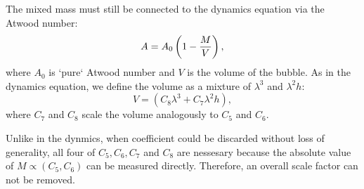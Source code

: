 The mixed mass must still be connected to the dynamics equation via the Atwood number:
\begin{equation} \elabel{effective-atwood}
A = A_0 \left( 1 - \frac{M}{V}\right),
\end{equation}
where $A_0$ is `pure` Atwood number and
$V$ is the volume of the bubble.
As in the dynamics equation, we define the volume as a mixture of $\lambda^3$ and $\lambda^2 h$:
\begin{equation}
V = \left(C_8 \lambda^3 + C_7 \lambda^2 h\right),
\end{equation}
where $C_7$ and $C_8$ scale the volume analogously to $C_5$ and $C_6$.

Unlike in the dynmics, when coefficient could be discarded without loss of generality, all four of $C_5, C_6, C_7$ and $C_8$ are nessesary because the absolute value of $M \propto (C_5, C_6)$ can be measured directly.
Therefore, an overall scale factor can not be removed.

